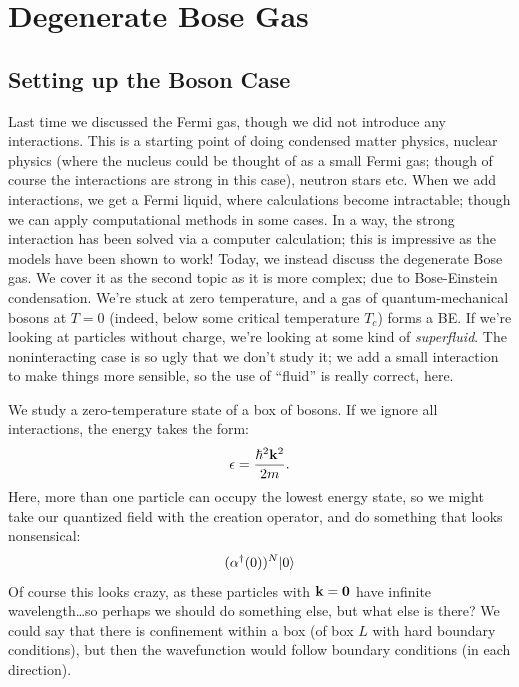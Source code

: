 \section{Degenerate Bose Gas}
\subsection{Setting up the Boson Case}
Last time we discussed the Fermi gas, though we did not introduce any interactions. This is a starting point of doing condensed matter physics, nuclear physics (where the nucleus could be thought of as a small Fermi gas; though of course the interactions are strong in this case), neutron stars etc. When we add interactions, we get a Fermi liquid, where calculations become intractable; though we can apply computational methods in some cases. In a way, the strong interaction has been solved via a computer calculation; this is impressive as the models have been shown to work! Today, we instead discuss the degenerate Bose gas. We cover it as the second topic as it is more complex; due to Bose-Einstein condensation. We're stuck at zero temperature, and a gas of quantum-mechanical bosons at $T = 0$ (indeed, below some critical temperature $T_c$) forms a BE. If we're looking at particles without charge, we're looking at some kind of \emph{superfluid}. The noninteracting case is so ugly that we don't study it; we add a small interaction to make things more sensible, so the use of ``fluid'' is really correct, here.

We study a zero-temperature state of a box of bosons. If we ignore all interactions, the energy takes the form:
\begin{equation}
    \epsilon = \frac{\hbar^2\mathbf{k}^2}{2m}.
\end{equation}
Here, more than one particle can occupy the lowest energy state, so we might take our quantized field with the creation operator, and do something that looks nonsensical:
\begin{equation}
    (\alpha^\dagger(0))^N\lvert 0 \rangle
\end{equation}
Of course this looks crazy, as these particles with $\mathbf{k} = \mathbf{0}$ have infinite wavelength\dots so perhaps we should do something else, but what else is there? We could say that there is confinement within a box (of box $L$ with hard boundary conditions), but then the wavefunction would follow boundary conditions (in each direction).

